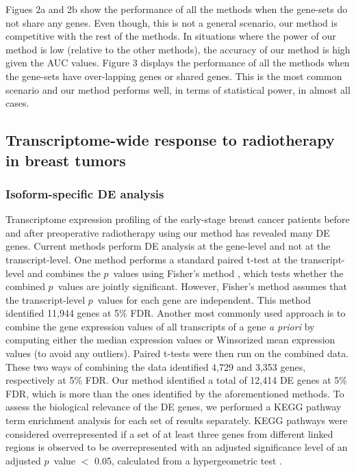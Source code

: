 \documentclass[hidelinks,11pt]{article}
\begin{document}
Figues 2a and 2b show the performance of all the methods when the gene-sets do not share any genes. Even though, this is not a general scenario, our method is competitive with the rest of the methods. In situations where the power of our method is low (relative to the other methods), the accuracy of our method is high given the AUC values. Figure 3 displays the performance of all the methods when the gene-sets have over-lapping genes or shared genes. This is the most common scenario and our method performs well, in terms of statistical power, in almost all cases. 

\subsection*{Transcriptome-wide response to radiotherapy in breast tumors}

\subsubsection*{Isoform-specific DE analysis}

Transcriptome expression profiling of the early-stage breast cancer patients before and after preoperative radiotherapy using our method has revealed many DE genes. Current methods perform DE analysis at the gene-level and not at the transcript-level. One method performs a standard paired t-test at the transcript-level and combines the $p$~values using Fisher's method \cite{fisher,birnbaum}, which tests whether the combined $p$~values are jointly significant. However, Fisher's method assumes that the transcript-level $p$~values for each gene are independent. This method identified 11,944 genes at 5\% FDR. Another most commonly used approach is to combine the gene expression values of all transcripts of a gene \emph{a priori} by computing either the median expression values or Winsorized mean expression values (to avoid any outliers). Paired t-tests were then run on the combined data. These two ways of combining the data identified 4,729 and 3,353 genes, respectively at 5\% FDR. Our method identified a total of 12,414 DE genes at 5\% FDR, which is more than the ones identified by the aforementioned methods. To assess the biological relevance of the DE genes, we performed a KEGG pathway term enrichment analysis \cite{kegg} for each set of results separately.  KEGG pathways were considered overrepresented if a set of
at least three genes from different linked regions is observed to be overrepresented with an adjusted significance level of an adjusted $p$~value $<$ 0.05, calculated from a hypergeometric test \cite{clusterProfiler}.  
\end{document}
